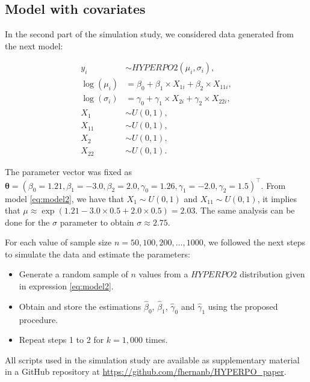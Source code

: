 \subsection{Model with covariates}\label{model-with-covariates}

In the second part of the simulation study, we considered data generated from the next model:

\begin{equation}
    \begin{split}
        y_i &\sim HYPERPO2(\mu _i, \sigma_i), \\
        \log(\mu_i) &= \beta_0 + \beta_1 \times X_{1i} + \beta_2 \times X_{11i}, \\
        \log(\sigma_i) &= \gamma_0 + \gamma_1 \times X_{2i} + \gamma_2 \times X_{22i},\\
        X_1 &\sim U(0, 1), \\
        X_{11} &\sim U(0, 1), \\
        X_2 &\sim U(0, 1), \\
        X_{22} &\sim U(0, 1).
    \end{split}
\label{eq:model2}
\end{equation}

The parameter vector was fixed as \(\boldsymbol{\theta}=(\beta_0=1.21, \beta_1=-3.0, \beta_2=2.0, \gamma_0=1.26, \gamma_1=-2.0, \gamma_2=1.5)^\top\). From model \eqref{eq:model2}, we have that \(X_1 \sim U(0, 1)\) and \(X_11 \sim U(0, 1)\), it implies that \(\mu \approx \exp(1.21 - 3.0 \times 0.5 + 2.0 \times 0.5) = 2.03\). The same analysis can be done for the \(\sigma\) parameter to obtain \(\sigma \approx 2.75\).

For each value of sample size \(n=50, 100, 200, \ldots, 1000\), we followed the next steps to simulate the data and estimate the parameters:

\begin{itemize}
\tightlist
\item
  Generate a random sample of \(n\) values from a \(HYPERPO2\) distribution given in expression \eqref{eq:model2}.
\item
  Obtain and store the estimations \(\hat{\beta}_0\), \(\hat{\beta}_1\), \(\hat{\gamma}_0\) and \(\hat{\gamma}_1\) using the proposed procedure.
\item
  Repeat steps 1 to 2 for \(k=1,000\) times.
\end{itemize}

All scripts used in the simulation study are available as supplementary material in a GitHub repository at \url{https://github.com/fhernanb/HYPERPO_paper}.

